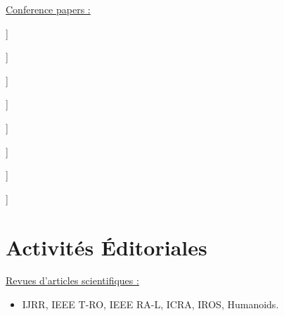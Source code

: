 \documentclass[11pt,a4paper,sans]{moderncv}        %
\newcommand{\items}{\item \hspace{2mm}}
\begin{document}

\large{\underline{Conference papers :}}

\begin{itemize}%
\normalsize{\item[[5]\hspace{-2mm}]} \footnotesize{}
\normalsize{\item[[6]\hspace{-2mm}]} \footnotesize{}
\normalsize{\item[[7]\hspace{-2mm}]} \footnotesize{}
\normalsize{\item[[8]\hspace{-2mm}]} \footnotesize{}
\normalsize{\item[[9]\hspace{-2mm}]} \footnotesize{}
\normalsize{\item[[10]\hspace{-2mm}]} \footnotesize{}
\normalsize{\item[[11]\hspace{-2mm}]} \footnotesize{}
\normalsize{\item[[12]\hspace{-2mm}]} \footnotesize{}
\end{itemize}

\newsavebox\mytempbib
\savebox\mytempbib{\parbox{\textwidth}{}}


\section{Activit\'es  \'Editoriales}
\large{\underline{Revues d'articles scientifiques :}}
\begin{itemize}%
\items IJRR, IEEE T-RO, IEEE RA-L, ICRA, IROS, Humanoids.
\end{itemize}
\end{document}

